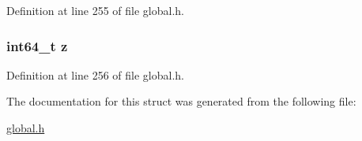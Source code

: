 Definition at line 255 of file global.\-h.

\hypertarget{structint64Vector3d_a44624880ae3bb63041297b70cb33408b}{
\subsubsection[{z}]{\setlength{\rightskip}{0pt plus 5cm}int64\-\_\-t z}}\label{structint64Vector3d_a44624880ae3bb63041297b70cb33408b}


Definition at line 256 of file global.\-h.



The documentation for this struct was generated from the following file\-:\begin{DoxyCompactItemize}
\item 
\hyperlink{global_8h}{global.\-h}\end{DoxyCompactItemize}
